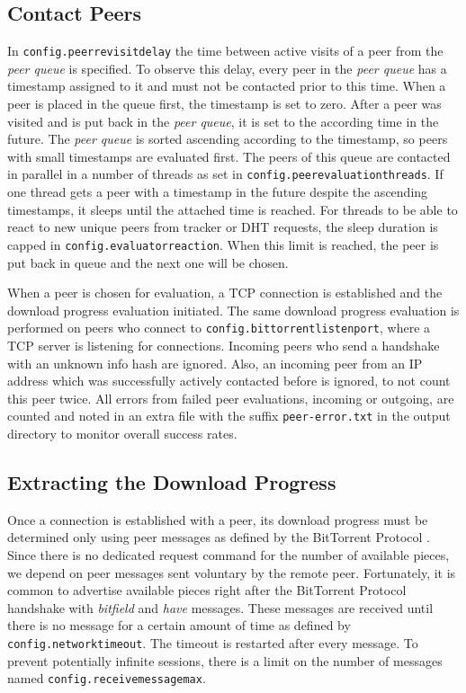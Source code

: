 \documentclass[10pt, a4paper, twoside=false, headsepline]{scrbook}
\renewcommand{\_}{\origunderscore\allowbreak}
\newcommand{\config}[1]{\texttt{config.\allowbreak #1}}
\begin{document}
\subsection{Contact Peers}
\label{cont}
In \config{peer\_revisit\_delay} the time between active visits of a peer from the \emph{peer queue} is specified. To observe this delay, every peer in the \emph{peer queue} has a timestamp assigned to it and must not be contacted prior to this time. When a peer is placed in the queue first, the timestamp is set to zero. After a peer was visited and is put back in the \emph{peer queue}, it is set to the according time in the future. The \emph{peer queue} is sorted ascending according to the timestamp, so peers with small timestamps are evaluated first. The peers of this queue are contacted in parallel in a number of threads as set in \config{peer\_evaluation\_threads}. If one thread gets a peer with a timestamp in the future despite the ascending timestamps, it sleeps until the attached time is reached. For threads to be able to react to new unique peers from tracker or DHT requests, the sleep duration is capped in \config{evaluator\_reaction}. When this limit is reached, the peer is put back in queue and the next one will be chosen.

When a peer is chosen for evaluation, a TCP connection is established and the download progress evaluation initiated. The same download progress evaluation is performed on peers who connect to \config{bittorrent\_listen\_port}, where a TCP server is listening for connections. Incoming peers who send a handshake with an unknown info hash are ignored. Also, an incoming peer from an IP address which was successfully actively contacted before is ignored, to not count this peer twice. All errors from failed peer evaluations, incoming or outgoing, are counted and noted in an extra file with the suffix \texttt{\_peer-error.txt} in the output directory to monitor overall success rates.

\subsection{Extracting the Download Progress}
\label{peer-evaluation}
Once a connection is established with a peer, its download progress must be determined only using peer messages as defined by the BitTorrent Protocol \cite{bep3}. Since there is no dedicated request command for the number of available pieces, we depend on peer messages sent voluntary by the remote peer. Fortunately, it is common to advertise available pieces right after the BitTorrent Protocol handshake with \emph{bitfield} and \emph{have} messages. These messages are received until there is no message for a certain amount of time as defined by \config{network\_timeout}. The timeout is restarted after every message. To prevent potentially infinite sessions, there is a limit on the number of messages named \config{receive\_message\_max}.
\end{document}
